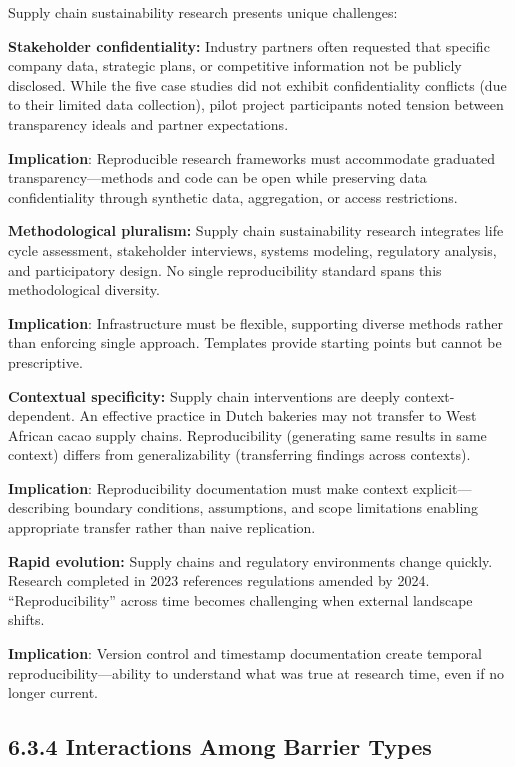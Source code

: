 \documentclass[
  oneside,
  open=any]{scrbook}
\begin{document}
Supply chain sustainability research presents unique challenges:

\textbf{Stakeholder confidentiality:} Industry partners often requested
that specific company data, strategic plans, or competitive information
not be publicly disclosed. While the five case studies did not exhibit
confidentiality conflicts (due to their limited data collection), pilot
project participants noted tension between transparency ideals and
partner expectations.

\textbf{Implication}: Reproducible research frameworks must accommodate
graduated transparency---methods and code can be open while preserving
data confidentiality through synthetic data, aggregation, or access
restrictions.

\textbf{Methodological pluralism:} Supply chain sustainability research
integrates life cycle assessment, stakeholder interviews, systems
modeling, regulatory analysis, and participatory design. No single
reproducibility standard spans this methodological diversity.

\textbf{Implication}: Infrastructure must be flexible, supporting
diverse methods rather than enforcing single approach. Templates provide
starting points but cannot be prescriptive.

\textbf{Contextual specificity:} Supply chain interventions are deeply
context-dependent. An effective practice in Dutch bakeries may not
transfer to West African cacao supply chains. Reproducibility
(generating same results in same context) differs from generalizability
(transferring findings across contexts).

\textbf{Implication}: Reproducibility documentation must make context
explicit---describing boundary conditions, assumptions, and scope
limitations enabling appropriate transfer rather than naive replication.

\textbf{Rapid evolution:} Supply chains and regulatory environments
change quickly. Research completed in 2023 references regulations
amended by 2024. ``Reproducibility'' across time becomes challenging
when external landscape shifts.

\textbf{Implication}: Version control and timestamp documentation create
temporal reproducibility---ability to understand what was true at
research time, even if no longer current.

\subsection{6.3.4 Interactions Among Barrier
Types}\label{interactions-among-barrier-types}
\end{document}
